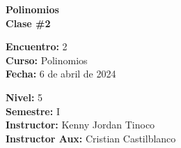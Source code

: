 \begin{center} \textbf
{
    \Large Polinomios \\ \vspace{2mm}Clase \#2
}
\end{center}

\begin{multicols}{2}
{
    \textbf{Encuentro:} 2\\
    \textbf{Curso:} Polinomios\\
    \textbf{Fecha:} 6 de abril de 2024\\
    \begin{flushright}
        \textbf{Nivel:} 5\\
        \textbf{Semestre:} I\\
        \textbf{Instructor:} Kenny Jordan Tinoco\\
        \textbf{Instructor Aux:} Cristian Castilblanco
    \end{flushright}
}
\end{multicols}

\thispagestyle{first-page-style}